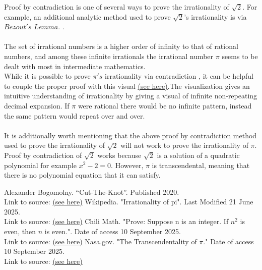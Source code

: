 \documentclass[12pt]{article}
\theoremstyle{plain}
\theoremstyle{definition}
\begin{document}
    Proof by contradiction is one of several ways to prove the irrationality of $\sqrt2$. For example, an additional analytic method used to prove $\sqrt2$'s irrationality is via $Bezout's$ $Lemma$.
    \cite{Alexander Bogomolny}. \\\\
    The set of irrational numbers is a higher order of infinity to that of rational numbers, and among these infinite irrationals the irrational number $\pi$ seems to be dealt with most in intermediate mathematics.\\
    While it is possible to prove $\pi's$ irrationality via contradiction \cite{Wikipedia}, it can be helpful to couple the proper proof with this visual \href{https://www.youtube.com/watch?v=YsIlEVeHc4k}{(see here)}.The visualization gives an intuitive understanding of irrationality by giving a visual of infinite non-repeating decimal expansion. If $\pi$ were rational there would be no infinite pattern, instead the same pattern would repeat over and over.\\\\
    It is additionally worth mentioning that the above proof by contradiction method used to prove the irrationality of $\sqrt{2}$ will not work to prove the irrationality of $\pi$.\\
    Proof by contradiction of $\sqrt{2}$ works because $\sqrt{2}$ is a solution of a quadratic polynomial for example $x^2-2=0$. However, $\pi$ is transcendental\cite{Nasa}, meaning that there is no polynomial equation that it can satisfy. 
    

\begin{thebibliography}{100}
         Alexander Bogomolny. ``Cut-The-Knot''. Published 2020.\\ Link to source: \href{https://www.cut-the-knot.org/proofs/FloydSqRt.shtml}{(see here)}
         Wikipedia. "Irrationality of pi". Last Modified 21 June 2025.\\ 
        Link to source: \href{https://en.wikipedia.org/wiki/Proof_that_%CF%80_is_irrational}{(see here)}
         Chili Math. "Prove: Suppose n is an integer. If $n^2$ is even, then $n$ is even.". Date of access 10 September 2025.\\ Link to source: \href{https://www.chilimath.com/lessons/basic-math-proofs/if-n-squared-is-even-then-n-is-even/}{(see  here)}
         Nasa.gov. "The Transcendentality of $\pi$." Date of access 10 September 2025.\\
        Link to source: \href{https://www.grc.nasa.gov/www/k-12/Numbers/Math/Mathematical_Thinking/transcendentality_of_p.htm}{(see here)}
    \end{thebibliography}
\end{document}
